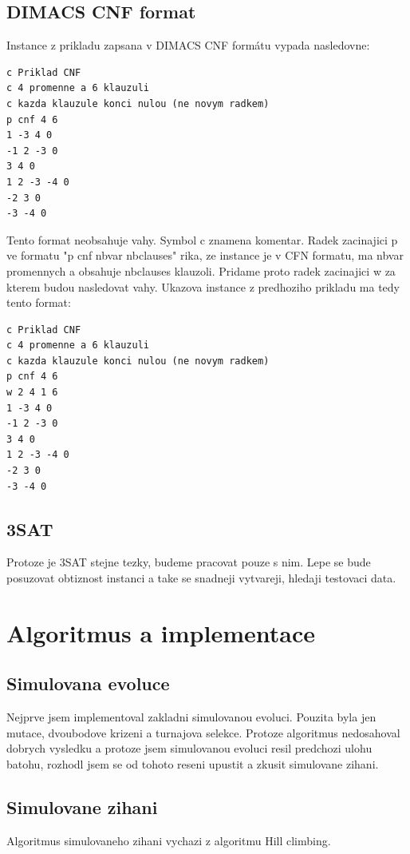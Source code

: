 \documentclass[12pt,a4paper]{article}
\begin{document}
\subsection{DIMACS CNF format}

Instance z prikladu zapsana v DIMACS CNF formátu vypada nasledovne:

\begin{verbatim}
c Priklad CNF
c 4 promenne a 6 klauzuli
c kazda klauzule konci nulou (ne novym radkem)
p cnf 4 6
1 -3 4 0
-1 2 -3 0
3 4 0
1 2 -3 -4 0
-2 3 0
-3 -4 0
\end{verbatim}

Tento format neobsahuje vahy. Symbol c znamena komentar. Radek zacinajici p ve formatu "p cnf nbvar nbclauses" rika, ze instance je v CFN formatu, ma nbvar promennych a obsahuje nbclauses klauzoli. Pridame proto radek zacinajici w za kterem budou nasledovat vahy. Ukazova instance z predhoziho prikladu ma tedy tento format:

\begin{verbatim}
c Priklad CNF
c 4 promenne a 6 klauzuli
c kazda klauzule konci nulou (ne novym radkem)
p cnf 4 6
w 2 4 1 6
1 -3 4 0
-1 2 -3 0
3 4 0
1 2 -3 -4 0
-2 3 0
-3 -4 0
\end{verbatim}

\subsection{3SAT}

Protoze je 3SAT stejne tezky, budeme pracovat pouze s nim. Lepe se bude posuzovat obtiznost instanci a take se snadneji vytvareji, hledaji testovaci data.


\section{Algoritmus a implementace}

\subsection{Simulovana evoluce}
Nejprve jsem implementoval zakladni simulovanou evoluci. Pouzita byla jen mutace, dvoubodove krizeni a turnajova selekce. Protoze algoritmus nedosahoval dobrych vysledku a protoze jsem simulovanou evoluci resil predchozi ulohu batohu, rozhodl jsem se od tohoto reseni upustit a zkusit simulovane zihani.

\subsection{Simulovane zihani}
Algoritmus simulovaneho zihani vychazi z algoritmu Hill climbing.
\end{document}
